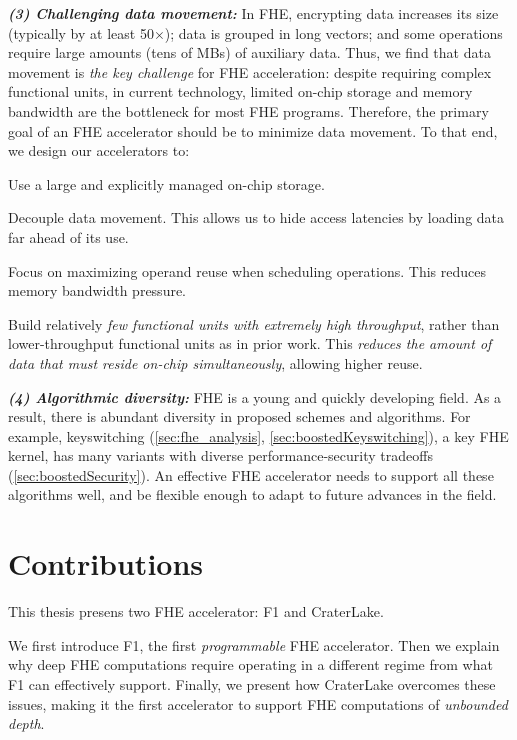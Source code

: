 \noindent \textbf{\emph{(3) Challenging data movement:}}
In FHE, encrypting data increases its size (typically by at least 50$\times$);
data is grouped in long vectors; and some operations require large amounts
(tens of MBs) of auxiliary data. Thus, we find that data movement is \emph{the
key challenge} for FHE acceleration: despite requiring complex functional
units, in current technology, limited on-chip storage and memory bandwidth are
the bottleneck for most FHE programs. Therefore, the primary goal of an FHE
accelerator should be to minimize data movement. To that end, we design our
accelerators to:
\begin{compactenum}
\item Use a large and explicitly managed on-chip storage.
\item Decouple data movement. This allows us to hide access latencies by
    loading data far ahead of its use.
\item Focus on maximizing operand reuse when scheduling operations. This reduces
    memory bandwidth pressure.
\item Build relatively \emph{few functional units with extremely high
    throughput}, rather than lower-throughput functional units as in prior
    work. This \emph{reduces the amount of data that must reside on-chip
    simultaneously}, allowing higher reuse.
\end{compactenum}

\noindent \textbf{\emph{(4) Algorithmic diversity:}}
FHE is a young and quickly developing field. As a result, there is abundant
diversity in proposed schemes and algorithms. For example, keyswitching
(\autoref{sec:fhe_analysis}, \autoref{sec:boostedKeyswitching}), a key FHE
kernel, has many variants with diverse performance-security tradeoffs
(\autoref{sec:boostedSecurity}). An effective FHE accelerator needs to support
all these algorithms well, and be flexible enough to adapt to future advances
in the field.

\section{Contributions}

This thesis presens two FHE accelerator: F1 and CraterLake.

We first introduce F1, the first \emph{programmable} FHE
accelerator. Then we explain why deep FHE computations require operating in a
different regime from what F1 can effectively support. Finally, we present how
CraterLake overcomes these issues, making it the first accelerator to support
FHE computations of \emph{unbounded depth}.


